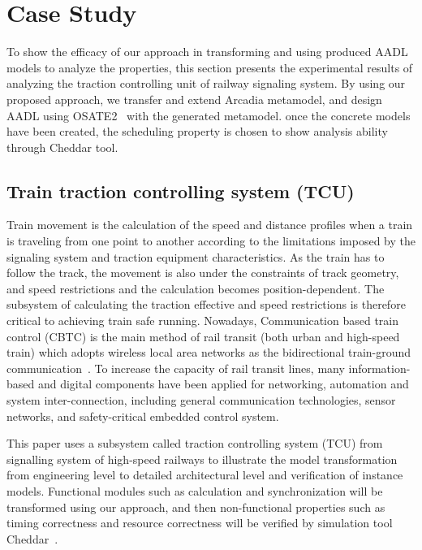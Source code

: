
\section{Case Study}\label{sec:imp_cs}
To show the efficacy of our approach in transforming and using produced AADL models to analyze the properties, this section presents the experimental results of analyzing the traction controlling unit of railway signaling system. By using our proposed approach, we transfer and extend Arcadia metamodel, and design AADL using OSATE2~\cite{osate2ref} with the generated metamodel. once the concrete models have been created, the scheduling property is chosen to show analysis ability through Cheddar tool. 



\subsection{Train traction controlling system (TCU)}
Train movement is the calculation of the speed and distance profiles when a train is traveling from one point to another according to the limitations imposed by the signaling system and traction equipment characteristics. As the train has to follow the track, the movement is also under the constraints of track geometry, and speed restrictions and the calculation becomes position-dependent. The subsystem of calculating the traction effective and speed restrictions is therefore critical to achieving train safe running.
Nowadays, Communication based train control (CBTC) is the main method of rail transit (both urban and high-speed train) which adopts wireless local area networks as the bidirectional train-ground communication~\cite{zhu2009train}. To increase the capacity of rail transit lines, many information-based and digital components have been applied for networking, automation and system inter-connection, including general communication technologies, sensor networks, and safety-critical embedded control system. %

This paper uses a subsystem called traction controlling system (TCU) from signalling system of high-speed railways to illustrate the model transformation from engineering level to detailed architectural level and verification of instance models. Functional modules such as calculation and synchronization will be transformed using our approach, and then non-functional properties such as timing correctness and resource correctness will be verified by simulation tool Cheddar~\cite{Singhoff:2004es}. 

